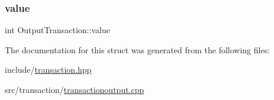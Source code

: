 \subsubsection{\texorpdfstring{value}{value}}
{\footnotesize\ttfamily int Output\+Transaction\+::value}



The documentation for this struct was generated from the following files\+:\begin{DoxyCompactItemize}
\item 
include/\mbox{\hyperlink{transaction_8hpp}{transaction.\+hpp}}\item 
src/transaction/\mbox{\hyperlink{transactionoutput_8cpp}{transactionoutput.\+cpp}}\end{DoxyCompactItemize}
